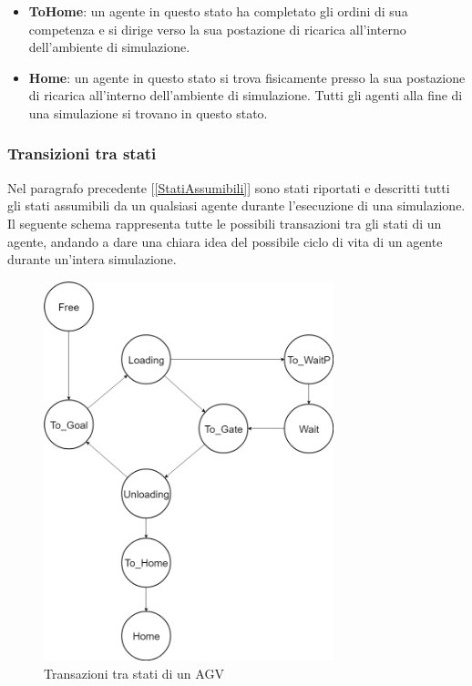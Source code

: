 \documentclass[12pt]{article}
\begin{document}
\begin{itemize}
    \item \textbf{ToHome}: un agente in questo stato ha completato gli ordini di sua competenza e si dirige verso la sua postazione di ricarica all'interno dell'ambiente di simulazione. 
    \item \textbf{Home}: un agente in questo stato si trova fisicamente presso la sua postazione di ricarica all'interno dell'ambiente di simulazione. Tutti gli agenti alla fine di una simulazione si trovano in questo stato.
\end{itemize}

\newpage

\subsubsection{Transizioni tra stati} \label{TransizioniStati}
Nel paragrafo precedente [\ref{StatiAssumibili}] sono stati riportati e descritti tutti gli stati assumibili da un qualsiasi agente durante l'esecuzione di una simulazione. Il seguente schema rappresenta tutte le possibili transazioni tra gli stati di un agente, andando a dare una chiara idea del possibile ciclo di vita di un agente durante un'intera simulazione.
\begin{figure}[ht]
\centering
\includegraphics[width=0.75\textwidth,keepaspectratio]{Figures/Graphics/State_Transaction.png}
\caption[Transizioni tra stati di un agente]{Transazioni tra stati di un AGV}
\label{fig:TransizioniStati}
\end{figure}
\end{document}
